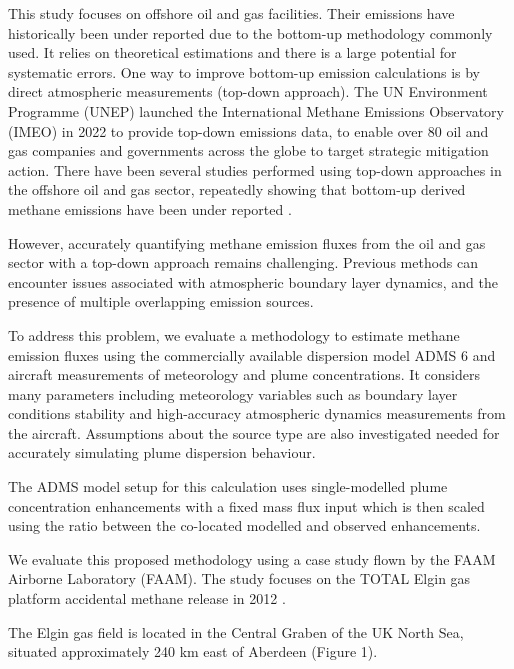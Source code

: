 \documentclass[12pt]{article}
\begin{document}
This study focuses on offshore oil and gas facilities. Their emissions have historically been under reported due to the bottom-up methodology commonly used.  It relies on theoretical estimations and there is a large potential for systematic errors.  One way to improve bottom-up emission calculations is by direct atmospheric measurements (top-down approach).  The UN Environment Programme (UNEP) launched the International Methane Emissions Observatory (IMEO) in 2022 to provide top-down emissions data, to enable over 80 oil and gas companies and governments across the globe to target strategic mitigation action. There have been several studies performed using top-down approaches in the offshore oil and gas sector, repeatedly showing that bottom-up derived methane emissions have been under reported \parencite{GorchovNegron2020AirborneMexico}.

However, accurately quantifying methane emission fluxes from the oil and gas sector with a top-down approach remains challenging. Previous methods can encounter issues associated with atmospheric boundary layer dynamics, and the presence of multiple overlapping emission sources. 

To address this problem, we evaluate a methodology to estimate methane emission fluxes using the commercially available dispersion model ADMS 6 and aircraft measurements of meteorology and plume concentrations.  It considers many parameters including meteorology variables such as boundary layer conditions stability and high-accuracy atmospheric dynamics measurements from the aircraft. Assumptions about the source type are also investigated needed for accurately simulating plume dispersion behaviour.

The ADMS model setup for this calculation  uses single-modelled plume concentration enhancements with a fixed mass flux input which is then scaled using the ratio between the co-located modelled and observed enhancements. 

We evaluate this proposed methodology using  a case study flown by the FAAM Airborne Laboratory (FAAM). The study focuses on the TOTAL Elgin gas platform accidental methane release in 2012 \parencite{Lee2018FlowRelease}. 

The Elgin gas field is located in the Central Graben of the UK North Sea, situated approximately 240 km east of Aberdeen (Figure 1).
\end{document}
